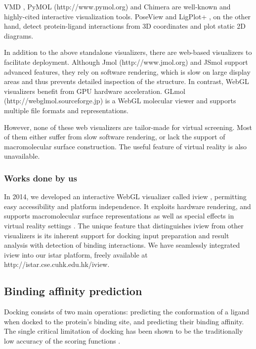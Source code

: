 \documentclass[a4paper,12pt]{article}
\begin{document}
VMD \citep{1220}, PyMOL (http://www.pymol.org) and Chimera \citep{1219} are well-known and highly-cited interactive visualization tools. PoseView \citep{748} and LigPlot+ \citep{951}, on the other hand, detect protein-ligand interactions from 3D coordinates and plot static 2D diagrams.

In addition to the above standalone visualizers, there are web-based visualizers to facilitate deployment. Although Jmol (http://www.jmol.org) and JSmol \citep{1314} support advanced features, they rely on software rendering, which is slow on large display areas and thus prevents detailed inspection of the structure. In contrast, WebGL visualizers benefit from GPU hardware acceleration. GLmol (http://webglmol.sourceforge.jp) is a WebGL molecular viewer and supports multiple file formats and representations.

However, none of these web visualizers are tailor-made for virtual screening. Most of them either suffer from slow software rendering, or lack the support of macromolecular surface construction. The useful feature of virtual reality is also unavailable.

\subsubsection*{Works done by us}

In 2014, we developed an interactive WebGL visualizer called iview \cite{1366}, permitting easy accessibility and platform independence. It exploits hardware rendering, and supports macromolecular surface representations as well as special effects in virtual reality settings \cite{1265}. The unique feature that distinguishes iview from other visualizers is its inherent support for docking input preparation and result analysis with detection of binding interactions. We have seamlessly integrated iview into our istar platform, freely available at http://istar.cse.cuhk.edu.hk/iview.

\subsection*{Binding affinity prediction}

Docking consists of two main operations: predicting the conformation of a ligand when docked to the protein's binding site, and predicting their binding affinity. The single critical limitation of docking has been shown to be the traditionally low accuracy of the scoring functions \cite{1362}.
\end{document}
